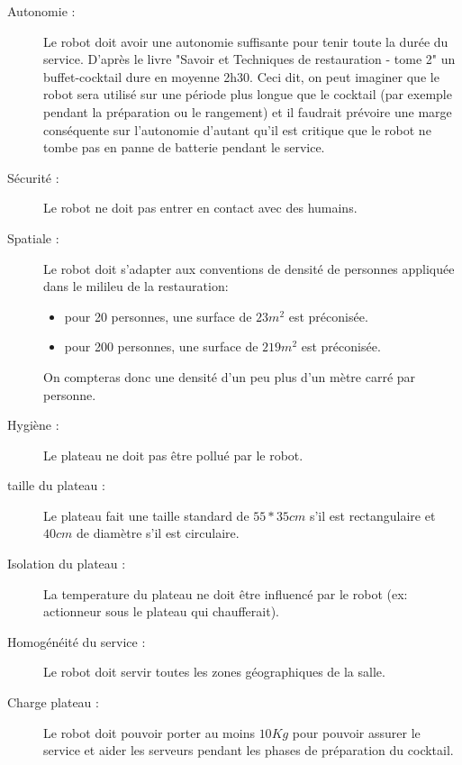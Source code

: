 \begin{description}
\item[Autonomie :] Le robot doit avoir une autonomie suffisante pour
  tenir toute la durée du service. D'après le livre "Savoir et
  Techniques de restauration - tome 2" un buffet-cocktail dure en
  moyenne 2h30. Ceci dit, on peut imaginer que le robot sera utilisé
  sur une période plus longue que le cocktail (par exemple pendant la
  préparation ou le rangement) et il faudrait prévoire une marge
  conséquente sur l'autonomie d'autant qu'il est critique que le robot
  ne tombe pas en panne de batterie pendant le service.
\item[Sécurité :] Le robot ne doit pas entrer en contact avec des humains.
\item[Spatiale :] Le robot doit s'adapter aux conventions de densité
  de personnes appliquée dans le milileu de la restauration:
  \begin{itemize}
  \item pour 20 personnes, une surface de $23m^2$ est préconisée.
  \item pour 200 personnes, une surface de $219m^2$ est préconisée.
  \end{itemize}
  On compteras donc une densité d'un peu plus d'un mètre carré par
  personne.
\item[Hygiène :] Le plateau ne doit pas être pollué par le robot.
\item[taille du plateau :] Le plateau fait une taille standard de
  $55*35cm$ s'il est rectangulaire et $40cm$ de diamètre s'il est
  circulaire.
\item[Isolation du plateau :] La temperature du plateau ne doit être
  influencé par le robot (ex: actionneur sous le plateau qui
  chaufferait).
\item[Homogénéité du service :] Le robot doit servir toutes les zones
  géographiques de la salle.
\item[Charge plateau :] Le robot doit pouvoir porter au moins $10Kg$
  pour pouvoir assurer le service et aider les serveurs pendant les
  phases de préparation du cocktail.
\end{description}




